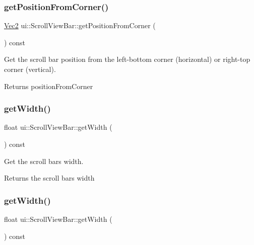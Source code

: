 \subsubsection{\texorpdfstring{get\+Position\+From\+Corner()}{getPositionFromCorner()}\hspace{0.1cm}{\footnotesize\ttfamily [2/2]}}
{\footnotesize\ttfamily \hyperlink{classVec2}{Vec2} ui\+::\+Scroll\+View\+Bar\+::get\+Position\+From\+Corner (\begin{DoxyParamCaption}{ }\end{DoxyParamCaption}) const}



Get the scroll bar position from the left-\/bottom corner (horizontal) or right-\/top corner (vertical). 

\begin{DoxyReturn}{Returns}
position\+From\+Corner 
\end{DoxyReturn}
\mbox{\label{classui_1_1ScrollViewBar_a9c5b59742146bf64bc2b3ca2e0c0b5f0}} 
\subsubsection{\texorpdfstring{get\+Width()}{getWidth()}\hspace{0.1cm}{\footnotesize\ttfamily [1/2]}}
{\footnotesize\ttfamily float ui\+::\+Scroll\+View\+Bar\+::get\+Width (\begin{DoxyParamCaption}{ }\end{DoxyParamCaption}) const}



Get the scroll bar\textquotesingle{}s width. 

\begin{DoxyReturn}{Returns}
the scroll bar\textquotesingle{}s width 
\end{DoxyReturn}
\mbox{\label{classui_1_1ScrollViewBar_a9c5b59742146bf64bc2b3ca2e0c0b5f0}} 
\subsubsection{\texorpdfstring{get\+Width()}{getWidth()}\hspace{0.1cm}{\footnotesize\ttfamily [2/2]}}
{\footnotesize\ttfamily float ui\+::\+Scroll\+View\+Bar\+::get\+Width (\begin{DoxyParamCaption}{ }\end{DoxyParamCaption}) const}




